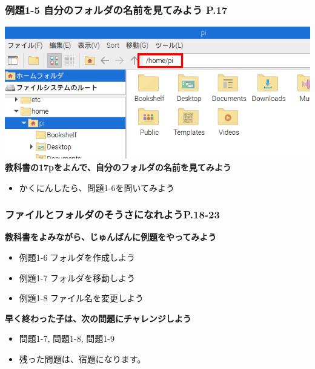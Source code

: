 \documentclass[dvipdfmx]{beamer}
\begin{document}
\begin{frame}[fragile]
	\frametitle{例題1-5 自分のフォルダの名前を見てみよう P.17~~~}
    \includegraphics[width=\textwidth]{slide02_004.png}
    \vfill
    \large\textbf{教科書の17pをよんで、自分のフォルダの名前を見てみよう}
    \begin{itemize}
      \item かくにんしたら、問題1-6を問いてみよう
    \end{itemize}
\end{frame}

\begin{frame}[fragile]
	\frametitle{ファイルとフォルダのそうさになれようP.18-23~~~}
      \large\textbf{教科書をよみながら、じゅんばんに例題をやってみよう}
				\begin{itemize}
					\item 例題1-6 フォルダを作成しよう
					\item 例題1-7 フォルダを移動しよう
					\item 例題1-8 ファイル名を変更しよう
				\end{itemize}
      \vfill
      \large\textbf{早く終わった子は、次の問題にチャレンジしよう}
      \begin{itemize}
        \item 問題1-7, 問題1-8, 問題1-9
        \item 残った問題は、宿題になります。
      \end{itemize}
\end{frame}
\end{document}
